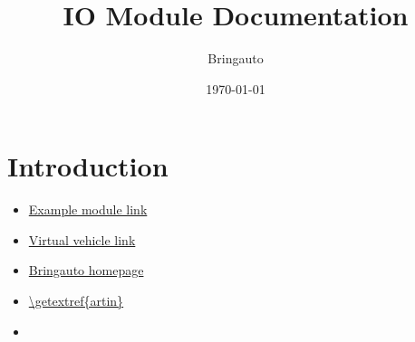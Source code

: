 \documentclass{article}
\title{IO Module Documentation}
\author{Bringauto}
\date{\today}
\begin{document}
\maketitle %

\section{Introduction}

\begin{itemize}
    \item \href{\getref{example_module}}{Example module link}
    \item \href{\getref{virtual_vehicle}}{Virtual vehicle link}   
    \item \href{\getextref{bringauto}}{Bringauto homepage}
    \item \url{\getextref{artin}}
    \item {}
\end{itemize}
\end{document}
